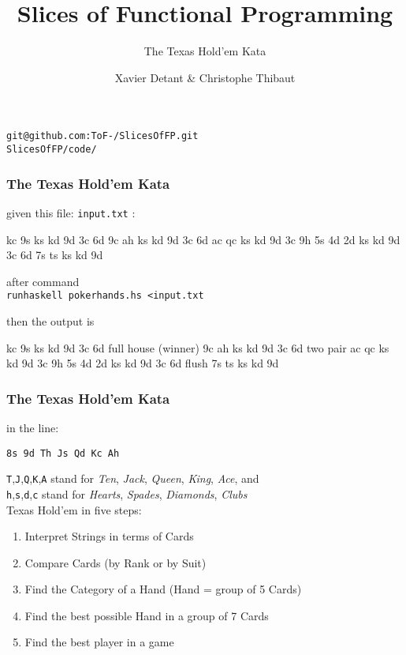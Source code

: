 \documentclass[11pt,xcolor={dvipsnames}]{beamer}
\newcommand{\vs}{\vspace{1em}}
\begin{document}
\title{Slices of Functional Programming}
\subtitle{The Texas Hold'em Kata}
\author{Xavier Detant \& Christophe Thibaut}
\begin{frame}
\titlepage
\begin{center}
\texttt{git@github.com:ToF-/SlicesOfFP.git}\\
\texttt{SlicesOfFP/code/}
\end{center}
\end{frame}
\begin{frame}[fragile]
\frametitle{The Texas Hold'em Kata}
given this file: \texttt{input.txt} :
\begin{term}
    kc 9s ks kd 9d 3c 6d 
    9c ah ks kd 9d 3c 6d
    ac qc ks kd 9d 3c 
    9h 5s 
    4d 2d ks kd 9d 3c 6d
    7s ts ks kd 9d
\end{term}
after command\\ \texttt{runhaskell pokerhands.hs <input.txt}

then the output is
\begin{term}
    kc 9s ks kd 9d 3c 6d full house (winner)
    9c ah ks kd 9d 3c 6d two pair
    ac qc ks kd 9d 3c 
    9h 5s 
    4d 2d ks kd 9d 3c 6d flush
    7s ts ks kd 9d
\end{term}
\end{frame}
\begin{frame}[fragile]
\frametitle{The Texas Hold'em Kata}

in the line:\\
\begin{center}
\texttt{8s 9d Th Js Qd Kc Ah}
\end{center}
\texttt{T},\texttt{J},\texttt{Q},\texttt{K},\texttt{A} stand for \emph{Ten}, \emph{Jack}, \emph{Queen}, \emph{King}, \emph{Ace}, and\\
\texttt{h},\texttt{s},\texttt{d},\texttt{c} stand for \emph{Hearts}, \emph{Spades}, \emph{Diamonds}, \emph{Clubs}\\
\vs
Texas Hold'em in five steps:
\begin{enumerate}
\item Interpret Strings in terms of Cards
\item Compare Cards (by Rank or by Suit)
\item Find the Category of a Hand (Hand = group of 5 Cards)
\item Find the best possible Hand in a group of 7 Cards
\item Find the best player in a game
\end{enumerate}
\end{frame}
\end{document}
